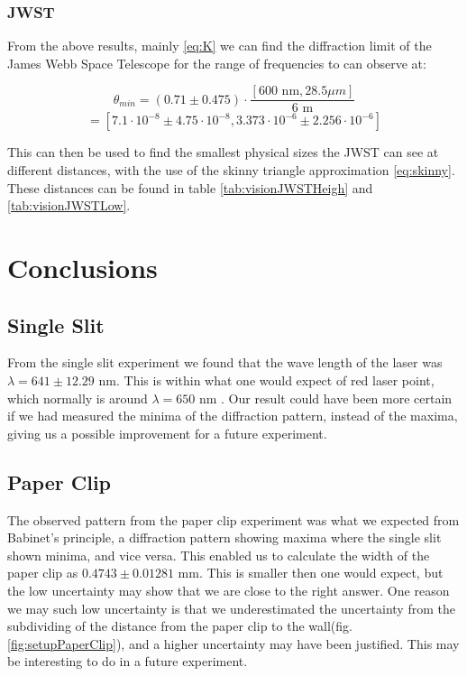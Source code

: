 \documentclass{emulateapj}
\begin{document}
\subsubsection{JWST}
From the above results, mainly \eqref{eq:K} we can find the diffraction limit of the James Webb Space Telescope for the range of frequencies to can observe at:

\begin{equation}
\theta_{min} = (0.71 \pm 0.475) \cdot \frac{[600 \text{ nm}, 28.5 \mu m]}{6 \text{ m}}
\end{equation}
\begin{equation}
= [7.1\cdot 10^{-8} \pm 4.75\cdot 10^{-8},3.373\cdot10^{-6} \pm 2.256\cdot10^{-6}]
\end{equation}\label{JWSTDiffLimit}

This can then be used to find the smallest physical sizes the JWST can see at different distances, with the use of the skinny triangle approximation \eqref{eq:skinny}. These distances can be found in table \ref{tab:visionJWSTHeigh} and \ref{tab:visionJWSTLow}.
\section{Conclusions}
\label{sec:conclusions}

\subsection{Single Slit}
From the single slit experiment we found that the wave length of the laser was $\lambda = 641 \pm 12.29 \text{ nm}$. This is within what one would expect of red laser point, which normally is around $\lambda = 650$ nm \cite{laser}. Our result could have been more certain if we had measured the minima of the diffraction pattern, instead of the maxima, giving us a possible improvement for a future experiment.

\subsection{Paper Clip}
The observed pattern from the paper clip experiment was what we expected from Babinet's principle, a diffraction pattern showing maxima where the single slit shown minima, and vice versa. This enabled us to calculate the width of the paper clip as $0.4743 \pm 0.01281 \text{ mm}$. This is smaller then one would expect, but the low uncertainty may show that we are close to the right answer. One reason we may such low uncertainty is that we underestimated the uncertainty from the subdividing of the distance from the paper clip to the wall(fig. \ref{fig:setupPaperClip}), and a higher uncertainty may have been justified. This may be interesting to do in a future experiment.
\end{document}
